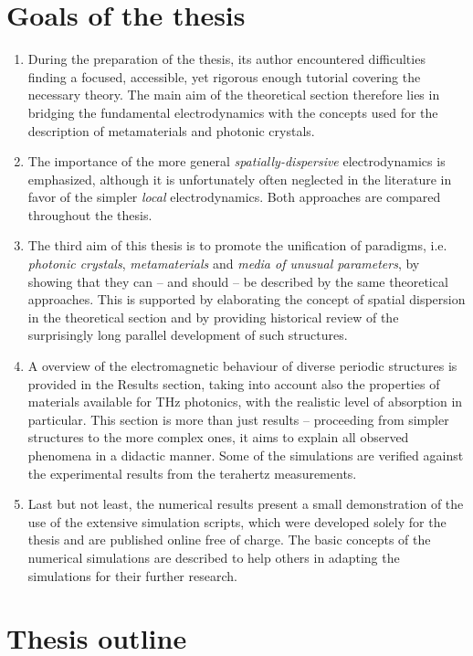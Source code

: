 
\section{Goals of the thesis}%
\begin{enumerate}
\item{During the preparation of the thesis, its author encountered difficulties finding a focused, accessible, yet rigorous enough tutorial covering the necessary theory. The main aim of the theoretical section therefore lies in bridging the fundamental electrodynamics with the concepts used for the description of metamaterials and photonic crystals.} 
\item{The importance of the more general \textit{spatially-dispersive} electrodynamics is emphasized, although it is unfortunately often neglected in the literature in favor of the simpler \textit{local} electrodynamics. Both approaches are compared throughout the thesis.} 
\item{The third aim of this thesis is to promote the unification of paradigms, i.e. \textit{photonic crystals}, \textit{metamaterials} and \textit{media of unusual parameters}, by showing that they can -- and should -- be described by the same theoretical approaches. This is supported by elaborating the concept of spatial dispersion in the theoretical section and by providing historical review of the surprisingly long parallel development of such structures.} 
\item{A overview of the electromagnetic behaviour of diverse periodic structures is provided in the Results section, taking into account also the properties of materials available for THz photonics, with the realistic level of absorption in particular. This section is more than just results -- proceeding from simpler structures to the more complex ones, it aims to explain all observed phenomena in a didactic manner. Some of the simulations are verified against the experimental results from the terahertz measurements.} 
\item{Last but not least, the numerical results present a small demonstration of the use of the extensive simulation scripts, which were developed solely for the thesis and are published online free of charge. The basic concepts of the numerical simulations are described to help others in adapting the simulations for their further research. } 
\end{enumerate}
\section{Thesis outline}
